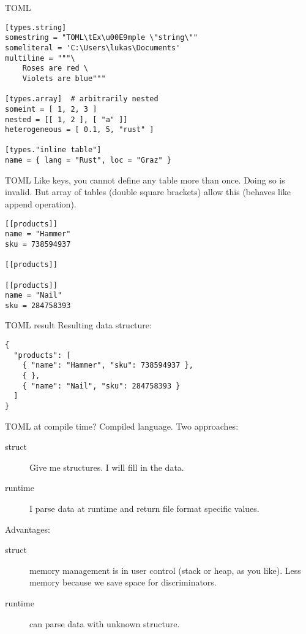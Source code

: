 \documentclass{beamer}
\begin{document}
\begin{frame}[fragile]{TOML}
  \begin{verbatim}
[types.string]
somestring = "TOML\tEx\u00E9mple \"string\""
someliteral = 'C:\Users\lukas\Documents'
multiline = """\
    Roses are red \
    Violets are blue"""

[types.array]  # arbitrarily nested
someint = [ 1, 2, 3 ]
nested = [[ 1, 2 ], [ "a" ]]
heterogeneous = [ 0.1, 5, "rust" ]

[types."inline table"]
name = { lang = "Rust", loc = "Graz" }
  \end{verbatim}
\end{frame}

\begin{frame}[fragile]{TOML}
  Like keys, you cannot define any table more than once. Doing so is invalid.
  But array of tables (double square brackets) allow this (behaves like append operation).
  \begin{verbatim}
[[products]]
name = "Hammer"
sku = 738594937

[[products]]

[[products]]
name = "Nail"
sku = 284758393
  \end{verbatim}
\end{frame}

\begin{frame}[fragile]{TOML result}
  Resulting data structure:
  \begin{verbatim}
{
  "products": [
    { "name": "Hammer", "sku": 738594937 },
    { },
    { "name": "Nail", "sku": 284758393 }
  ]
}
  \end{verbatim}
\end{frame}

\begin{frame}[fragile]{TOML at compile time?}
  Compiled language. Two approaches:
  \begin{description}
    \item[struct] Give me structures. I will fill in the data.
    \item[runtime] I parse data at runtime and return file format specific values.
  \end{description}
  Advantages:
  \begin{description}
    \item[struct] memory management is in user control (stack or heap, as you like). Less memory because we save space for discriminators.
    \item[runtime] can parse data with unknown structure.
  \end{description}
\end{frame}
\end{document}

